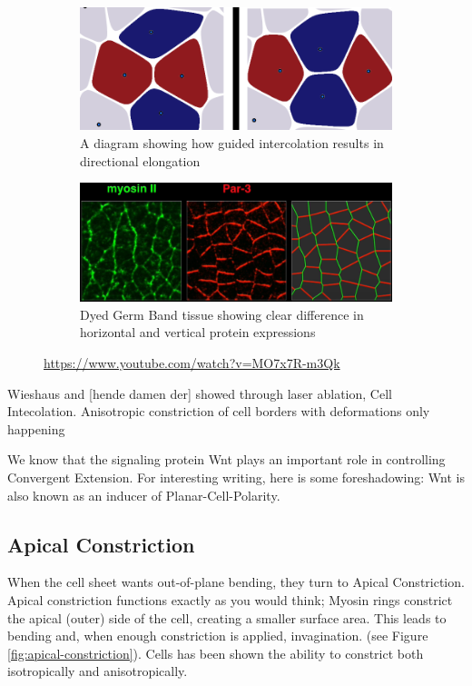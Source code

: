 \begin{figure}[H]
    \centering
    \begin{subfigure}{0.45\linewidth}
        \centering
    \includegraphics[width=\linewidth]{chapters/Theory/figures/ConvergentExtensionDiagram.png}
    \caption{A diagram showing how guided intercolation results in directional elongation}
    \end{subfigure}
        \begin{subfigure}{0.45\linewidth}
        \centering
        \caption{Dyed Germ Band tissue showing clear difference in horizontal and vertical protein expressions}
    \includegraphics[width=\linewidth]{chapters/Theory/figures/bipolar-PCP.png}
    \end{subfigure}
    \caption{\cite{zallen2004patterned}\url{https://www.youtube.com/watch?v=MO7x7R-m3Qk}}
    
    \label{fig:ConvergentExtensionDiagram}
\end{figure}

Wieshaus and [hende damen der] showed through laser ablation, Cell Intecolation. Anisotropic constriction of cell borders with deformations only happening  



We know that the signaling protein Wnt plays an important role in controlling Convergent Extension. For interesting writing, here is some foreshadowing: Wnt is also known as an inducer of Planar-Cell-Polarity.

\subsection{ Apical Constriction }
When the cell sheet wants out-of-plane bending, they turn to Apical Constriction. Apical constriction functions exactly as you would think; Myosin rings constrict the apical (outer) side of the cell, creating a smaller surface area. This leads to bending and, when enough constriction is applied, invagination. (see Figure \ref{fig:apical-constriction}). Cells has been shown the ability to constrict both isotropically and anisotropically.


